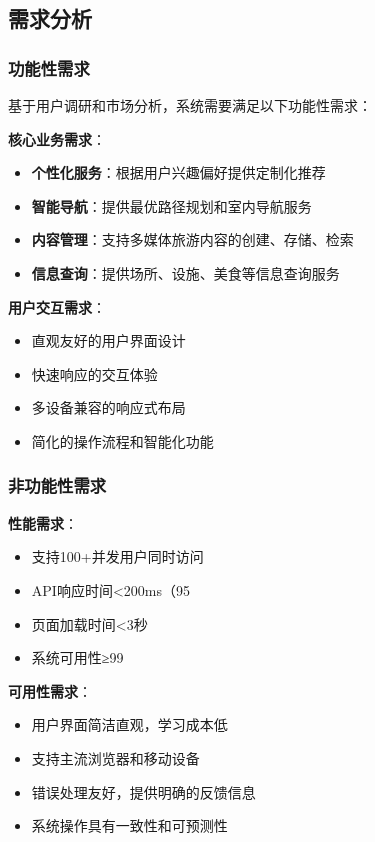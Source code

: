 \documentclass[12pt,a4paper]{article}
\begin{document}
\subsection{需求分析}
\subsubsection{功能性需求}
基于用户调研和市场分析，系统需要满足以下功能性需求：

\textbf{核心业务需求}：
\begin{itemize}
    \item \textbf{个性化服务}：根据用户兴趣偏好提供定制化推荐
    \item \textbf{智能导航}：提供最优路径规划和室内导航服务
    \item \textbf{内容管理}：支持多媒体旅游内容的创建、存储、检索
    \item \textbf{信息查询}：提供场所、设施、美食等信息查询服务
\end{itemize}

\textbf{用户交互需求}：
\begin{itemize}
    \item 直观友好的用户界面设计
    \item 快速响应的交互体验
    \item 多设备兼容的响应式布局
    \item 简化的操作流程和智能化功能
\end{itemize}

\subsubsection{非功能性需求}
\textbf{性能需求}：
\begin{itemize}
    \item 支持100+并发用户同时访问
    \item API响应时间<200ms（95%
    \item 页面加载时间<3秒
    \item 系统可用性≥99%
\end{itemize}

\textbf{可用性需求}：
\begin{itemize}
    \item 用户界面简洁直观，学习成本低
    \item 支持主流浏览器和移动设备
    \item 错误处理友好，提供明确的反馈信息
    \item 系统操作具有一致性和可预测性
\end{itemize}
\end{document}
